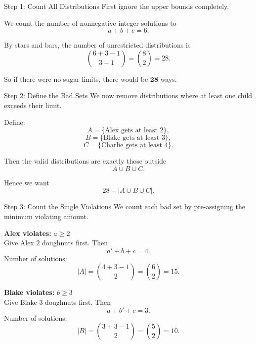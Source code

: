 \begin{frame}{Step 1: Count All Distributions}
  First ignore the upper bounds completely.

  \vspace{0.5em}

  We count the number of nonnegative integer solutions to
  \[
    a+b+c=6.
  \]

  By stars and bars, the number of unrestricted distributions is
  \[
    \binom{6+3-1}{3-1} = \binom{8}{2} = 28.
  \]

  \vspace{0.5em}

  So if there were no sugar limits, there would be \textbf{28} ways.
\end{frame}

\begin{frame}{Step 2: Define the Bad Sets}
  We now remove distributions where at least one child exceeds their limit.

  \vspace{0.5em}

  Define:
  \[
    A = \{\text{Alex gets at least } 2\},
  \]
  \[
    B = \{\text{Blake gets at least } 3\},
  \]
  \[
    C = \{\text{Charlie gets at least } 4\}.
  \]

  \vspace{0.5em}

  Then the valid distributions are exactly those outside
  \[
    A \cup B \cup C.
  \]

  Hence we want
  \[
    28 - |A \cup B \cup C|.
  \]
\end{frame}

\begin{frame}{Step 3: Count the Single Violations}
  We count each bad set by pre-assigning the minimum violating amount.

  \vspace{0.5em}

  \textbf{Alex violates:} $a \ge 2$\\
  Give Alex $2$ doughnuts first. Then
  \[
    a'+b+c = 4.
  \]
  Number of solutions:
  \[
    |A| = \binom{4+3-1}{2} = \binom{6}{2} = 15.
  \]

  \vspace{0.5em}

  \textbf{Blake violates:} $b \ge 3$\\
  Give Blake $3$ doughnuts first. Then
  \[
    a+b'+c = 3.
  \]
  Number of solutions:
  \[
    |B| = \binom{3+3-1}{2} = \binom{5}{2} = 10.
  \]
\end{frame}

